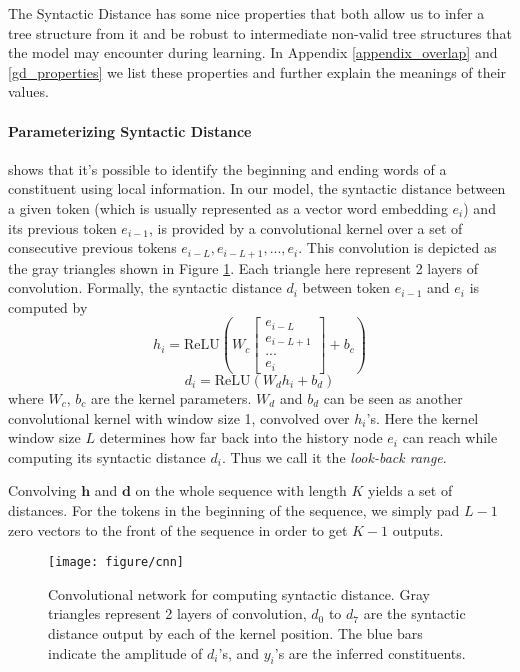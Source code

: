 \documentclass{article} \usepackage{iclr2018_conference,times}
\begin{document}
The Syntactic Distance has some nice properties that both allow us to infer a tree structure from it and be robust to intermediate non-valid tree structures that the model may encounter during learning. In Appendix \ref{appendix_overlap} and \ref{gd_properties} we list these properties and further explain the meanings of their values.

\paragraph{Parameterizing Syntactic Distance}
\cite{roark2008classifying} shows that it's possible to identify the beginning and ending words of a constituent using local information. In our model, the syntactic distance between a given token (which is usually represented as a vector word embedding $e_i$) and its previous token $e_{i-1}$, is provided by a convolutional kernel over a set of consecutive previous tokens $e_{i-L}, e_{i-L+1}, ..., e_i$. This convolution is depicted as the gray triangles shown in Figure \ref{fig_conv}. Each triangle here represent 2 layers of convolution. Formally, the syntactic distance $d_i$ between token $e_{i-1}$ and $e_i$ is computed by
\begin{equation} \label{conv_kernel_1}
h_i = \mathrm{ReLU}(W_c \left[ \begin{matrix} e_{i-L} \\ e_{i-L+1} \\ ... \\ e_i \end{matrix} \right] + b_c)
\end{equation}
\begin{equation} \label{conv_kernel_2}
d_i = \mathrm{ReLU} \left(W_d h_i + b_d\right)
\end{equation}
where $W_c$, $b_c$ are the kernel parameters. $W_d$ and $b_d$ can be seen as another convolutional kernel with window size 1, convolved over $h_i$'s. Here the kernel window size $L$ determines how far back into the history node $e_i$ can reach while computing its syntactic distance $d_i$. Thus we call it the \emph{look-back range}. 

Convolving $\bm{h}$ and $\bm{d}$ on the whole sequence with length $K$ yields a set of distances. For the tokens in the beginning of the sequence, we simply pad $L-1$ zero vectors to the front of the sequence in order to get $K-1$ outputs.

\begin{figure}[h]
  \centering
  \texttt{[image: figure/cnn]}
  \caption{Convolutional network for computing syntactic distance. Gray triangles represent 2 layers of convolution,
$d_0$ to $d_7$ are the syntactic distance output by each of the kernel position. The blue bars indicate the amplitude of $d_i$'s, and $y_i$'s are the inferred constituents.}
\label{fig_conv}
\end{figure}
\end{document}
